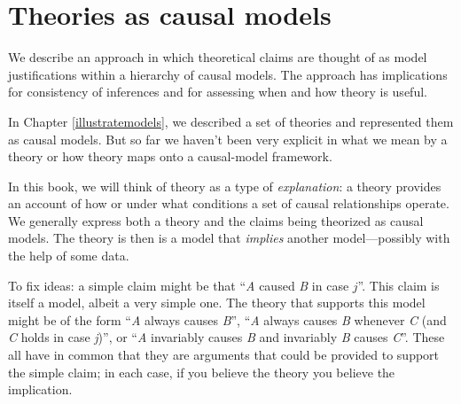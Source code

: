 \documentclass[
  12pt,
]{book}
\newenvironment{headerbox}{
  \definecolor{shadecolor}{rgb}{0.8, 0.8, 0.8}  %
  \color{black}
  \begin{shaded}}{\end{shaded}}
\begin{document}
\hypertarget{theory}{%
\chapter{Theories as causal models}\label{theory}}

\begin{headerbox}
We describe an approach in which theoretical claims are thought of as model justifications within a hierarchy of causal models. The approach has implications for consistency of inferences and for assessing when and how theory is useful.

\end{headerbox}

In Chapter \ref{illustratemodels}, we described a set of theories and represented them as causal models. But so far we haven't been very explicit in what we mean by a theory or how theory maps onto a causal-model framework.

In this book, we will think of theory as a type of \emph{explanation}: a theory provides an account of how or under what conditions a set of causal relationships operate. We generally express both a theory and the claims being theorized as causal models. The theory is then is a model that \emph{implies} another model---possibly with the help of some data.

To fix ideas: a simple claim might be that ``\emph{A} caused \emph{B} in case \(j\)''. This claim is itself a model, albeit a very simple one. The theory that supports this model might be of the form ``\emph{A} always causes \emph{B}'', ``\emph{A} always causes \emph{B} whenever \emph{C} (and \emph{C} holds in case \emph{j})'', or ``\emph{A} invariably causes \emph{B} and invariably \emph{B} causes \emph{C}''. These all have in common that they are arguments that could be provided to support the simple claim; in each case, if you believe the theory you believe the implication.
\end{document}
